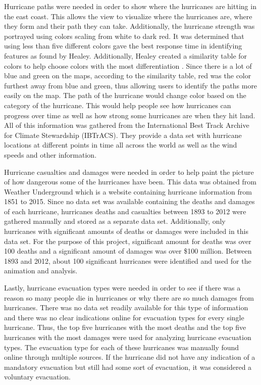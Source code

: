 Hurricane paths were needed in order to show where the hurricanes are hitting in the east coast. This allows the view to visualize where the hurricanes are, where they form and their path they can take. Additionally, the hurricane strength was portrayed using colors scaling from white to dark red. It was determined that using less than five different colors gave the best response time in identifying features as found by Healey. Additionally, Healey created a similarity table for colors to help choose colors with the most differentiation \cite{healey1996choosing}. Since there is a lot of blue and green on the maps, according to the similarity table, red was the color furthest away from blue and green, thus allowing users to identify the paths more easily on the map. The path of the hurricane would change color based on the category of the hurricane. This would help people see how hurricanes can progress over time as well as how strong some hurricanes are when they hit land. All of this information was gathered from the International Best Track Archive for Climate Stewardship (IBTrACS). They provide a data set with hurricane locations at different points in time all across the world as well as the wind speeds and other information. 

Hurricane casualties and damages were needed in order to help paint the picture of how dangerous some of the hurricanes have been. This data was obtained from Weather Underground which is a website containing hurricane information from 1851 to 2015. Since no data set was available containing the deaths and damages of each hurricane, hurricanes deaths and casualties between 1893 to 2012 were gathered manually and stored as a separate data set. Additionally, only hurricanes with significant amounts of deaths or damages were included in this data set. For the purpose of this project, significant amount for deaths was over 100 deaths and a significant amount of damages was over \$100 million. Between 1893 and 2012, about 100 significant hurricanes were identified and used for the animation and analysis.

Lastly, hurricane evacuation types were needed in order to see if there was a reason so many people die in hurricanes or why there are so much damages from hurricanes. There was no data set readily available for this type of information and there was no clear indications online for evacuation types for every single hurricane. Thus, the top five hurricanes with the most deaths and the top five hurricanes with the most damages were used for analyzing hurricane evacuation types. The evacuation type for each of these hurricanes was manually found online through multiple sources. If the hurricane did not have any indication of a mandatory evacuation but still had some sort of evacuation, it was considered a voluntary evacuation. 

